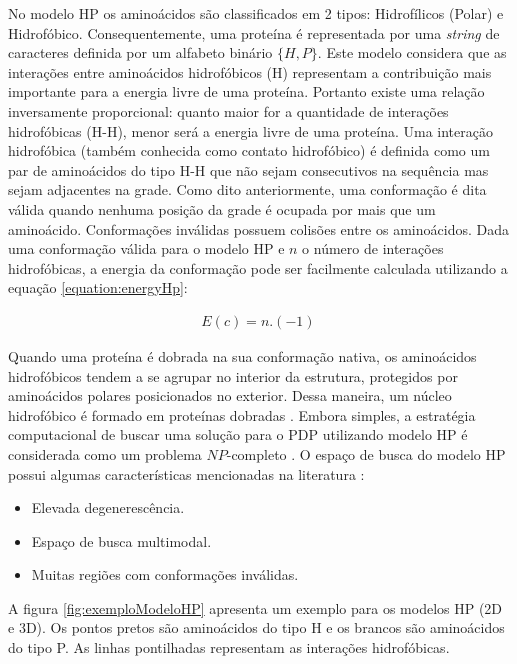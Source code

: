 No modelo HP os aminoácidos são classificados em 2 tipos: Hidrofílicos (Polar) e Hidrofóbico. Consequentemente, uma proteína é representada por uma \textit{string} de caracteres definida por um alfabeto binário $\{H,P\}$. Este modelo considera que as interações entre aminoácidos hidrofóbicos (H) representam a contribuição mais importante para a energia livre de uma proteína. Portanto existe uma relação inversamente proporcional: quanto maior for a quantidade de interações hidrofóbicas (H-H), menor será a energia livre de uma proteína. Uma interação hidrofóbica (também conhecida como contato hidrofóbico) é definida como um par de aminoácidos do tipo H-H que não sejam consecutivos na sequência mas sejam adjacentes na grade.
Como dito anteriormente, uma conformação é dita válida quando nenhuma posição da grade é ocupada por mais que um aminoácido. Conformações inválidas possuem colisões entre os aminoácidos. Dada uma conformação válida para o modelo HP e $n$ o número de interações hidrofóbicas, a energia da conformação pode ser facilmente calculada utilizando a equação \ref{equation:energyHp}: 


\begin{align}
	\label{equation:energyHp}
	E(c) = n. (-1) 
	\
\end{align}


Quando uma proteína é dobrada na sua conformação nativa, os aminoácidos hidrofóbicos tendem a se agrupar no interior da estrutura, protegidos por aminoácidos polares posicionados no exterior. Dessa maneira, um núcleo hidrofóbico é formado em proteínas dobradas \cite{benitez2015algoritmo}. 
Embora simples, a estratégia computacional de buscar uma solução para o PDP utilizando modelo HP é considerada como um problema $NP$-completo \cite{atkins1999intractability, berger1998protein, crescenzi1998complexity}. O espaço de busca do modelo HP possui algumas características mencionadas na literatura \cite{bastolla1997testing, berger1998protein, crescenzi1998complexity, krasnogor1999protein, vendruscolo2000can} :

\begin{itemize}
	\item Elevada degenerescência.
	\item Espaço de busca multimodal.
	\item Muitas regiões com conformações inválidas.
\end{itemize}

A figura \ref{fig:exemploModeloHP} apresenta um exemplo para os modelos HP (2D e 3D). Os pontos pretos são aminoácidos do tipo H e os brancos são aminoácidos do tipo P. As linhas pontilhadas representam as interações hidrofóbicas.

